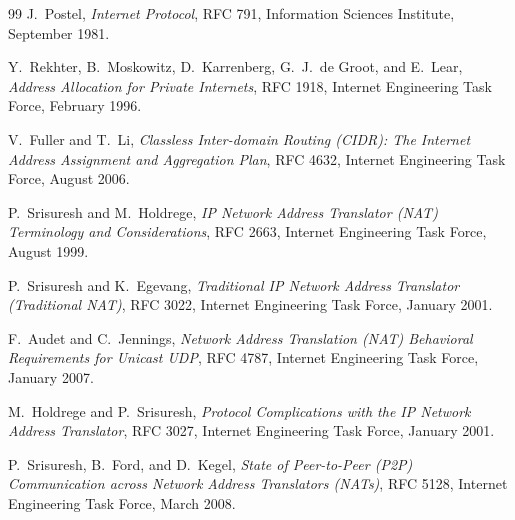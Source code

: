 
\begin{thebibliography}{99}
	J.~Postel,
	\textit{Internet Protocol},
	RFC 791,
	Information Sciences Institute,
	September 1981.

	Y.~Rekhter, B.~Moskowitz, D.~Karrenberg, G.~J.~de Groot, and E.~Lear,
	\textit{Address Allocation for Private Internets},
	RFC 1918,
	Internet Engineering Task Force,
	February 1996.

	V.~Fuller and T.~Li,
	\textit{Classless Inter-domain Routing (CIDR): The Internet Address Assignment and Aggregation Plan},
	RFC 4632,
	Internet Engineering Task Force,
	August 2006.

	P.~Srisuresh and M.~Holdrege,
	\textit{IP Network Address Translator (NAT) Terminology and Considerations},
	RFC 2663,
	Internet Engineering Task Force,
	August 1999.

	P.~Srisuresh and K.~Egevang,
	\textit{Traditional IP Network Address Translator (Traditional NAT)},
	RFC 3022,
	Internet Engineering Task Force,
	January 2001.

	F.~Audet and C.~Jennings,
	\textit{Network Address Translation (NAT) Behavioral Requirements for Unicast UDP},
	RFC 4787,
	Internet Engineering Task Force,
	January 2007.

	M.~Holdrege and P.~Srisuresh,
	\textit{Protocol Complications with the IP Network Address Translator},
	RFC 3027,
	Internet Engineering Task Force,
	January 2001.

	P.~Srisuresh, B.~Ford, and D.~Kegel,
	\textit{State of Peer-to-Peer (P2P) Communication across Network Address Translators (NATs)},
	RFC 5128,
	Internet Engineering Task Force,
	March 2008.


\end{thebibliography}
